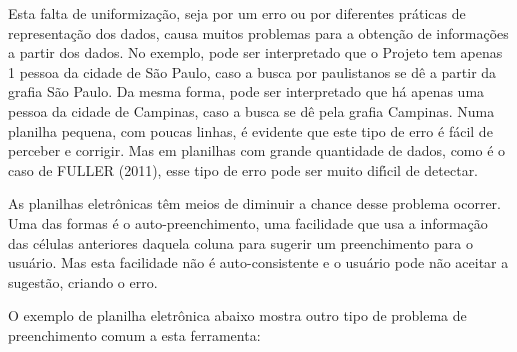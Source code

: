 \documentclass[
12pt,		%
openright,	%
twoside,  %
a4paper,			%
chapter=TITLE,		%
english,			%
french,				%
spanish,			%
brazil				%
]{USPSC-classe/USPSC}
\begin{document}
Esta falta de uniformiza\c{c}\~ao, seja por um erro ou por diferentes pr\'aticas de representa\c{c}\~ao dos dados, causa muitos problemas para a obten\c{c}\~ao de informa\c{c}\~oes a partir dos dados. No exemplo, pode ser interpretado que o Projeto tem apenas 1 pessoa da cidade de S\~ao Paulo, caso a busca por paulistanos se d\^e a partir da grafia \textquotedbl S\~ao Paulo\textquotedbl . Da mesma forma, pode ser interpretado que h\'a apenas uma pessoa da cidade de Campinas, caso a busca se d\^e pela grafia \textquotedbl Campinas\textquotedbl . Numa planilha pequena, com poucas linhas, \'e evidente que este tipo de erro \'e f\'acil de perceber e corrigir. Mas em planilhas com grande quantidade de dados, como \'e o caso de  FULLER (2011), esse tipo de erro pode ser muito dif\'{\i}cil de detectar.

















As planilhas eletr\^onicas t\^em meios de diminuir a chance desse problema ocorrer. Uma das formas \'e o auto-preenchimento, uma facilidade que usa a informa\c{c}\~ao das c\'elulas anteriores daquela coluna para sugerir um preenchimento para o usu\'ario. Mas esta facilidade n\~ao \'e auto-consistente e o usu\'ario pode n\~ao aceitar a sugest\~ao, criando o erro.

















O exemplo de planilha eletr\^onica abaixo mostra outro tipo de problema de preenchimento comum a esta ferramenta:
\end{document}
